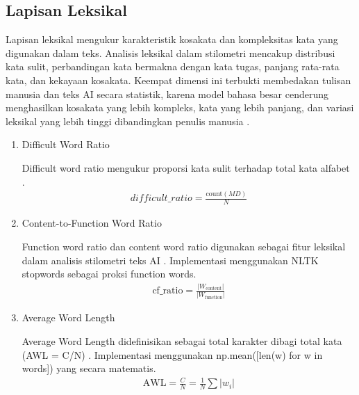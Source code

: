 \subsection{Lapisan Leksikal}

Lapisan leksikal mengukur karakteristik kosakata dan kompleksitas kata yang digunakan dalam teks. Analisis leksikal dalam stilometri mencakup distribusi kata sulit, perbandingan kata bermakna dengan kata tugas, panjang rata-rata kata, dan kekayaan kosakata. Keempat dimensi ini terbukti membedakan tulisan manusia dan teks AI secara statistik, karena model bahasa besar cenderung menghasilkan kosakata yang lebih kompleks, kata yang lebih panjang, dan variasi leksikal yang lebih tinggi dibandingkan penulis manusia \cite{Jaashan2025}.

\begin{enumerate}[label=\arabic*., leftmargin=*]
  \item Difficult Word Ratio
  
  Difficult word ratio mengukur proporsi kata sulit terhadap total kata alfabet \cite{Farrell2026}.
  \begin{equation}
  \label{eq:16}
  \begin{split}
difficult\_ratio=\frac{\text{count}\left(MD\right)}{N}
  \end{split}
  \end{equation}

  \item Content-to-Function Word Ratio
  
  Function word ratio dan content word ratio digunakan sebagai fitur leksikal dalam analisis stilometri teks AI \cite{Jaashan2025}. Implementasi menggunakan NLTK stopwords sebagai proksi function words.
  \begin{equation}
  \label{eq:17}
  \begin{split}
\mathrm{cf}\_\mathrm{ratio}=\frac{\left|W_{\text{content}}\right|}{\left|W_{\text{function}}\right|}
  \end{split}
  \end{equation}

  \item Average Word Length
  
  Average Word Length didefinisikan sebagai total karakter dibagi total kata (AWL = C/N) \cite{Alam2026}. Implementasi menggunakan np.mean([len(w) for w in words]) yang secara matematis.
  \begin{equation}
  \label{eq:18}
  \begin{split}
  \mathrm{AWL}=\frac{C}{N}=\frac{1}{N}\sum \left|w_{i}\right|
  \end{split}
  \end{equation}


\end{enumerate}
